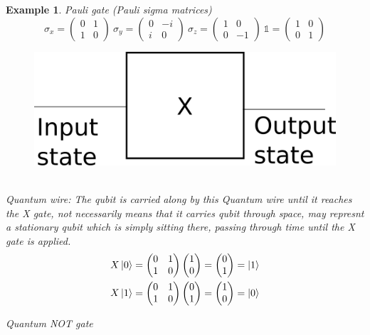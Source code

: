 \documentclass[]{article}
\newtheorem*{example}{Example}
\theoremstyle{nonumberplain}
\begin{document}
\begin{example}
	Pauli gate (Pauli sigma matrices) \\
\[
\sigma_{x}=
\begin{pmatrix}
	0 & 1\\
	1 & 0
\end{pmatrix}
\ \sigma_{y}=
\begin{pmatrix}
	0 & -i\\
	i & 0
\end{pmatrix}
\ \sigma_{z}=
\begin{pmatrix}
	1 & 0\\
	0 & -1 
\end{pmatrix}
\ \mathds{1}=
\begin{pmatrix}
	1 & 0\\
	0 & 1 
\end{pmatrix}
\] 
\begin{figure}[!hbt]
	\centering
	\includegraphics[scale=0.5]{graph/1.png}
\end{figure}
\\
Quantum wire: The qubit is carried along by this Quantum wire until it reaches the X gate, not necessarily means that it carries qubit through space, may represnt a stationary qubit which is simply sitting there, passing through time until the X gate is applied.
\begin{equation*}
\begin{aligned}
	X\ket{0} &= 
\begin{pmatrix}
	0 & 1 \\
	1 & 0 
\end{pmatrix}
\begin{pmatrix}
1 \\
0
\end{pmatrix}
=
\begin{pmatrix}
0 \\
1
\end{pmatrix}
=\ket{1} 
\\
X\ket{1} &= 
\begin{pmatrix}
	0 & 1 \\
	1 & 0 
\end{pmatrix}
\begin{pmatrix}
0 \\
1
\end{pmatrix}
=
\begin{pmatrix}
1 \\
0
\end{pmatrix}
= \ket{0}
\end{aligned}
\end{equation*}
\begin{center}
Quantum NOT gate
\end{center}
\end{example}
\end{document}
